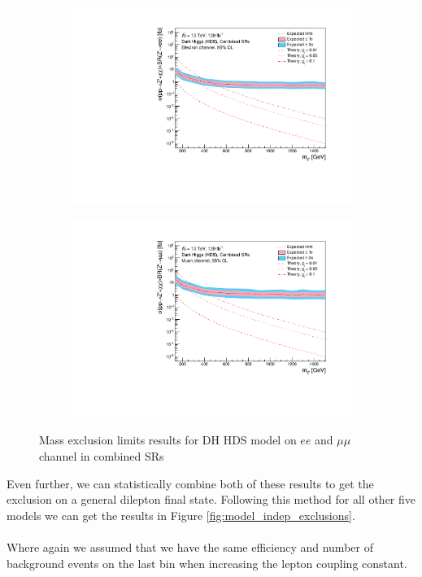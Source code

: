 \documentclass[12pt, a4paper]{book}
\begin{document}
\begin{figure}[!ht]
	\centering
	\begin{subfigure}[b]{0.49\textwidth}
      \centering
      \includegraphics[width=1\textwidth]{Limits/Model_independent/DH_HDS/mass_exclusion_ee.pdf}
   \end{subfigure}
   \hfill
   \begin{subfigure}[b]{0.49\textwidth}
      \centering
      \includegraphics[width=1\textwidth]{Limits/Model_independent/DH_HDS/mass_exclusion_uu.pdf}
   \end{subfigure}
   \caption{Mass exclusion limits results for DH HDS model on $ee$ and $\mu\mu$ channel in combined SRs}\label{fig:DH_HDS_me_comb}
\end{figure}
Even further, we can statistically combine both of these results to get the exclusion on a general dilepton final state. Following this method for all other five models we can get the results in Figure \ref{fig:model_indep_exclusions}.\\
\\Where again we assumed that we have the same efficiency and number of background events on the last bin when increasing the lepton coupling constant.
\end{document}
